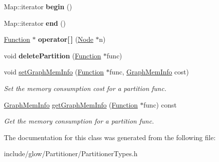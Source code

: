\begin{DoxyCompactItemize}
Map\+::iterator {\bfseries begin} ()
\item 
\mbox{\label{classglow_1_1_node_to_function_map_afe89fb350bbd970c1086e0183e998135}} 
Map\+::iterator {\bfseries end} ()
\item 
\mbox{\label{classglow_1_1_node_to_function_map_ac41d4704027248df6abb21ad91f5b5d8}} 
\hyperlink{classglow_1_1_function}{Function} $\ast$ {\bfseries operator\mbox{[}$\,$\mbox{]}} (\hyperlink{classglow_1_1_node}{Node} $\ast$n)
\item 
\mbox{\label{classglow_1_1_node_to_function_map_a815e91a73666b97fcc096ed30d26141f}} 
void {\bfseries delete\+Partition} (\hyperlink{classglow_1_1_function}{Function} $\ast$func)
\item 
\mbox{\label{classglow_1_1_node_to_function_map_a269c553f3278cbb1e6283461d5417281}} 
void \hyperlink{classglow_1_1_node_to_function_map_a269c553f3278cbb1e6283461d5417281}{set\+Graph\+Mem\+Info} (\hyperlink{classglow_1_1_function}{Function} $\ast$func, \hyperlink{structglow_1_1_graph_mem_info}{Graph\+Mem\+Info} cost)
\begin{DoxyCompactList}\small\item\em Set the memory consumption {\ttfamily cost} for a partition {\ttfamily func}. \end{DoxyCompactList}\item 
\mbox{\label{classglow_1_1_node_to_function_map_a872b694b5bf3669000a01e82d2ea551b}} 
\hyperlink{structglow_1_1_graph_mem_info}{Graph\+Mem\+Info} \hyperlink{classglow_1_1_node_to_function_map_a872b694b5bf3669000a01e82d2ea551b}{get\+Graph\+Mem\+Info} (\hyperlink{classglow_1_1_function}{Function} $\ast$func) const
\begin{DoxyCompactList}\small\item\em Get the memory consumption for a partition {\ttfamily func}. \end{DoxyCompactList}\end{DoxyCompactItemize}


The documentation for this class was generated from the following file\+:\begin{DoxyCompactItemize}
\item 
include/glow/\+Partitioner/Partitioner\+Types.\+h\end{DoxyCompactItemize}
